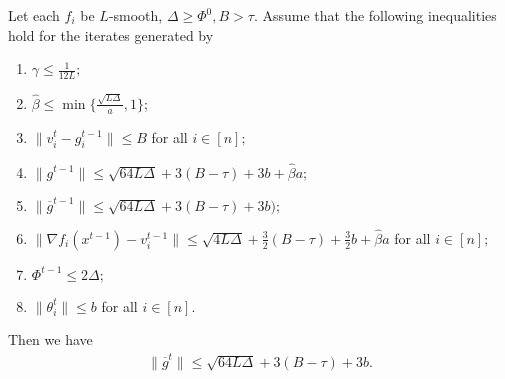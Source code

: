 \documentclass[a4paper,11pt]{article}
\begin{document}
\begin{lemma}\label{lem:bound_gt_hat}
    Let each $f_i$ be $L$-smooth, $\Delta \ge \Phi^0, B > \tau.$ Assume that the following inequalities hold for the iterates generated by 
    \begin{enumerate}
        \item $\gamma \le \frac{1}{12L};$
        \item $\hat{\beta} \le \min\{\frac{\sqrt{L\Delta}}{a},1\}$;
        \item $\|v_i^t - g_i^{t-1}\|\le B$ for all $i\in[n];$
        \item $\|g^{t-1}\| \le \sqrt{64L\Delta} + 3(B-\tau) + 3b + \hat{\beta}a;$
        \item  $\|\overline{g}^{t-1}\| \le \sqrt{64L\Delta} + 3(B-\tau) + 3b);$
        \item $\|\nabla f_i(x^{t-1}) - v_i^{t-1}\| \le \sqrt{4L\Delta} + \frac{3}{2}(B-\tau) + \frac{3}{2}b + \hat{\beta}a$ for all $i\in[n];$
        \item $\Phi^{t-1} \le 2\Delta;$
        \item $\|\theta_i^t\| \le b$ for all $i\in[n].$ 
    \end{enumerate}
    Then we have 
    \begin{align*}
        \|\overline{g}^t\| \le \sqrt{64L\Delta} + 3(B-\tau) + 3b.
    \end{align*}
\end{lemma}
\end{document}
